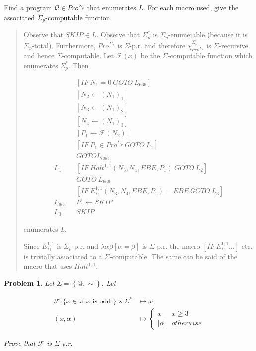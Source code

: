 \documentclass[a4paper, 12pt]{article}
\newtheorem{problem}{Problem}
\newtheorem{problem}{Problem}
\begin{document}
Find a program $\mathcal{Q} \in Pro^{\Sigma_p}$ that enumerates $L$. For each
macro used, give the associated $\Sigma_p$-computable function.


\small
\begin{quote}

    Observe that $SKIP \in L$. Observe that $\Sigma_p^*$ is
    $\Sigma_p$-enumerable (because it is $\Sigma_p$-total). Furthermore,
    $Pro^{\Sigma_p}$ is $\Sigma$-p.r. and therefore
    $\chi_{Pro^{\Sigma_p}}^{\Sigma_p}$ is $\Sigma$-recursive and hence
    $\Sigma$-computable. Let $\mathcal{F}(x)$ be the $\Sigma$-computable function which enumerates
    $\Sigma_p^*$. Then

    \begin{align*}
        &[IF ~ N_1 = 0 ~ GOTO ~ L_{666}] \\ 
        &[N_2 \leftarrow (N_1)_1]\\
        &[N_3 \leftarrow (N_1)_2]\\
        &[N_4 \leftarrow (N_1)_3] \\ 
        &[P_1 \leftarrow \mathcal{F}(N_2)] \\ 
        &[IF ~ P_1 \in Pro^{\Sigma_p} ~ GOTO ~ L_1] \\ 
        &GOTO L_{666} \\ 
        L_1 ~ ~ ~ &[IF ~ Halt^{1, 1}\left( N_3, N_4, EBE, P_1 \right) ~ GOTO ~
        L_2 ] \\ 
                  &GOTO ~ L_{666} \\ 
        &[IF ~ E_{*1}^{1, 1} \left( N_3, N_4, EBE, P_1 \right) = EBE ~ GOTO ~
        L_3] \\ 
        L_{666} ~ ~ ~ &P_1 \leftarrow SKIP \\ 
        L_3 ~ ~ ~ & SKIP
    \end{align*}

    enumerates $L$.

    Since $E_{*1}^{1, 1}$ is $\Sigma_p$-p.r. and $\lambda \alpha\beta \left[
    \alpha = \beta  \right]$ is $\Sigma$-p.r. the macro $[IF ~ E_{*1}^{1, 1}
    \ldots]$ etc. is trivially associated to a $\Sigma$-computable. The same can
    be said of the macro that uses $Halt^{1, 1}$.

\end{quote}
\normalsize

\begin{problem}
    Let $\Sigma = \left\{ @, \sim  \right\} $. Let 

    \begin{align*}
        \mathcal{F} : \{x \in \omega : x \text{ is odd }\} \times \Sigma^{*} &\mapsto
        \omega \\ 
        (x, \alpha) &\mapsto \begin{cases}
            x & x \geq 3 \\ 
            |\alpha| & otherwise
        \end{cases}
    \end{align*}

    Prove that $\mathcal{F}$ is $\Sigma$-p.r. 
\end{problem}
\end{document}
